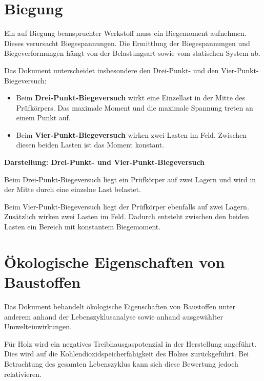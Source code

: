 \documentclass[
  12pt,
  a4paper,
  oneside
]{scrreprt}
\begin{document}
\section{Biegung}

Ein auf Biegung beanspruchter Werkstoff muss ein Biegemoment aufnehmen.
Dieses verursacht Biegespannungen. Die Ermittlung der Biegespannungen
und Biegeverformungen hängt von der Belastungsart sowie vom statischen
System ab. 

Das Dokument unterscheidet insbesondere den Drei-Punkt- und den
Vier-Punkt-Biegeversuch:

\begin{itemize}
  \item Beim \textbf{Drei-Punkt-Biegeversuch} wirkt eine Einzellast in
  der Mitte des Prüfkörpers. Das maximale Moment und die maximale
  Spannung treten an einem Punkt auf.

  \item Beim \textbf{Vier-Punkt-Biegeversuch} wirken zwei Lasten im
  Feld. Zwischen diesen beiden Lasten ist das Moment konstant.
\end{itemize}



\begin{darstellungsbox}
\textbf{Darstellung: Drei-Punkt- und Vier-Punkt-Biegeversuch}

Beim Drei-Punkt-Biegeversuch liegt ein Prüfkörper auf zwei Lagern und
wird in der Mitte durch eine einzelne Last belastet.

Beim Vier-Punkt-Biegeversuch liegt der Prüfkörper ebenfalls auf zwei
Lagern. Zusätzlich wirken zwei Lasten im Feld. Dadurch entsteht
zwischen den beiden Lasten ein Bereich mit konstantem Biegemoment.
\end{darstellungsbox}

\section{Ökologische Eigenschaften von Baustoffen}

Das Dokument behandelt ökologische Eigenschaften von Baustoffen unter
anderem anhand der Lebenszyklusanalyse sowie anhand ausgewählter
Umwelteinwirkungen. 

Für Holz wird ein negatives Treibhausgaspotenzial in der Herstellung
angeführt. Dies wird auf die Kohlendioxidspeicherfähigkeit des Holzes
zurückgeführt. Bei Betrachtung des gesamten Lebenszyklus kann sich
diese Bewertung jedoch relativieren. 
\end{document}

